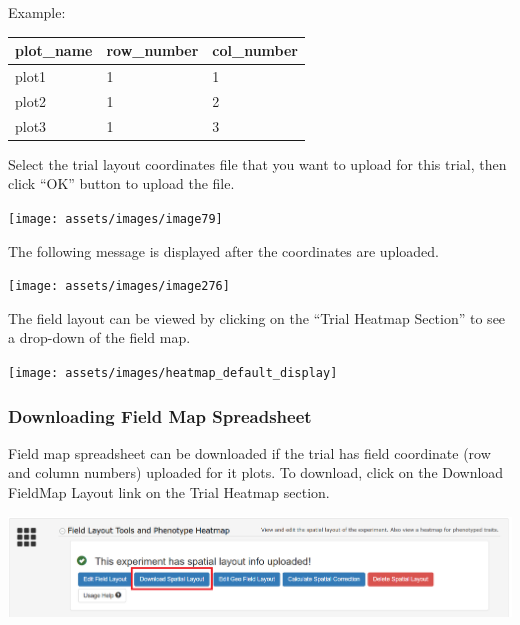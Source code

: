 \documentclass[
  12pt,
]{book}
\begin{document}
Example:

\begin{longtable}[]{@{}lll@{}}
\toprule\noalign{}
plot\_name & row\_number & col\_number \\
\midrule\noalign{}
\endhead
\bottomrule\noalign{}
\endlastfoot
plot1 & 1 & 1 \\
plot2 & 1 & 2 \\
plot3 & 1 & 3 \\
\end{longtable}

Select the trial layout coordinates file that you want to upload for this trial, then click ``OK'' button to upload the file.

\begin{center}\texttt{[image: assets/images/image79]} \end{center}

The following message is displayed after the coordinates are uploaded.

\begin{center}\texttt{[image: assets/images/image276]} \end{center}

The field layout can be viewed by clicking on the ``Trial Heatmap Section'' to see a drop-down of the field map.

\begin{center}\texttt{[image: assets/images/heatmap\_default\_display]} \end{center}

\hypertarget{downloading-field-map-spreadsheet}{%
\subsubsection*{Downloading Field Map Spreadsheet}\label{downloading-field-map-spreadsheet}}


Field map spreadsheet can be downloaded if the trial has field coordinate (row and column numbers) uploaded for it plots. To download, click on the Download FieldMap Layout link on the Trial Heatmap section.

\begin{center}\includegraphics[width=0.95\linewidth]{assets/images/field_map_download_link} \end{center}
\end{document}
